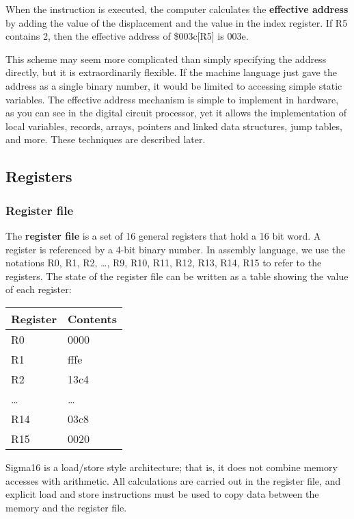 \documentclass[11pt]{article}
\begin{document}
When the instruction is executed, the computer calculates the
\textbf{effective address} by adding the value of the displacement and the
value in the index register.  If R5 contains 2, then the effective
address of \$003c[R5] is 003e.

This scheme may seem more complicated than simply specifying the
address directly, but it is extraordinarily flexible.  If the machine
language just gave the address as a single binary number, it would be
limited to accessing simple static variables.  The effective address
mechanism is simple to implement in hardware, as you can see in the
digital circuit processor, yet it allows the implementation of local
variables, records, arrays, pointers and linked data structures, jump
tables, and more.  These techniques are described later.


\subsection*{Registers}
\label{sec:org3b300cc}
\subsubsection*{Register file}
\label{sec:org2166800}

The \textbf{\textbf{register file}} is a set of 16 general registers that hold a 16
bit word.  A register is referenced by a 4-bit binary number.  In
assembly language, we use the notations R0, R1, R2, \ldots{}, R9, R10, R11,
R12, R13, R14, R15 to refer to the registers.  The state of the
register file can be written as a table showing the value of each
register:

\begin{center}
\begin{tabular}{ll}
Register & Contents\\
\hline
R0 & 0000\\
R1 & fffe\\
R2 & 13c4\\
\ldots{} & \ldots{}\\
R14 & 03c8\\
R15 & 0020\\
\end{tabular}
\end{center}

Sigma16 is a load/store style architecture; that is, it does not
combine memory accesses with arithmetic.  All calculations are carried
out in the register file, and explicit load and store instructions
must be used to copy data between the memory and the register file.
\end{document}

